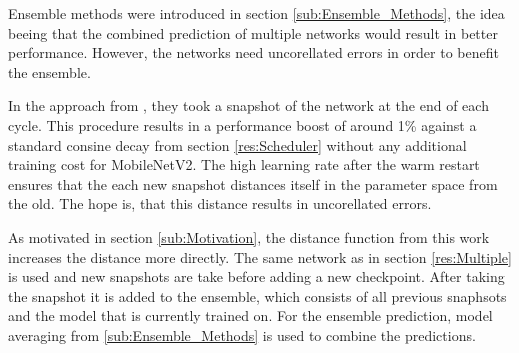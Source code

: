Ensemble methods were introduced in section \ref{sub:Ensemble_Methods}, the idea
beeing that the combined prediction of multiple networks would result in better
performance. However, the networks need uncorellated errors in order to benefit
the ensemble.

In the approach from \cite{loshchilov2016sgdr}, they took a snapshot of the
network at the end of each cycle. This procedure results in a performance boost
of around 1\% against a standard consine decay from section \ref{res:Scheduler}
without any additional training cost for MobileNetV2. The high learning rate
after the warm restart ensures that the each new snapshot distances itself in
the parameter space from the old. The hope is, that this distance results in
uncorellated errors.

As motivated in section \ref{sub:Motivation}, the distance function from this
work increases the distance more directly. The same network as in section
\ref{res:Multiple} is used and new snapshots are take before adding a new
checkpoint. After taking the snapshot it is added to the ensemble, which
consists of all previous snaphsots and the model that is currently trained on.
For the ensemble prediction, model averaging from \ref{sub:Ensemble_Methods} is
used to combine the predictions.

